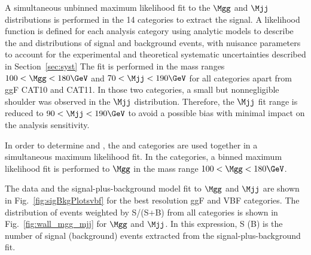\documentclass[11pt,a4paper,cmspaper,final,collab]{cms-tdr}
\begin{document}
A simultaneous unbinned
maximum likelihood fit to the $\Mgg$ and $\Mjj$ distributions is performed in the 14 \HH categories to extract the \HH signal. A likelihood function is defined for each analysis category using analytic models to describe the \Mgg and \Mjj distributions of signal and background events, with nuisance parameters to account for the experimental and theoretical systematic uncertainties described in Section~\ref{sec:syst}
 The fit is performed in the mass ranges \mbox{$100 < \Mgg < 180\GeV$} and \mbox{$70 < \Mjj < 190 \GeV$} for all categories apart from ggF CAT10 and CAT11. In those two categories, a small but nonnegligible shoulder was observed in the $\Mjj$ distribution. Therefore, the $\Mjj$ fit range is reduced to \mbox{$90 < \Mjj < 190 \GeV$} to avoid a possible bias with minimal
impact on the analysis sensitivity. 

In order to determine \kapl and \kapt, the \HH and \ttH categories are used together in a simultaneous maximum likelihood fit. 
In the \ttH categories, a binned maximum likelihood fit is performed to $\Mgg$ in the mass range $100 < \Mgg < 180\GeV$. 

The data and the signal-plus-background model fit to $\Mgg$ and $\Mjj$ are shown in Fig.~\ref{fig:sigBkgPlotsvbf} for the best resolution ggF and VBF categories. 
The distribution of events weighted by S/(S+B) from all \HH categories is shown in Fig.~\ref{fig:wall_mgg_mjj} for $\Mgg$ and $\Mjj$. In this expression, S (B) is the number of signal (background) events extracted from the signal-plus-background fit.
\end{document}
